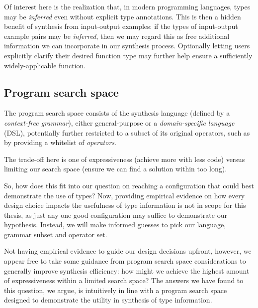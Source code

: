 \documentclass{article}
\begin{document}
Of interest here is the realization that, in modern programming languages, types may be \emph{inferred} even without explicit type annotations.
This is then a hidden benefit of synthesis from input-output examples:
if the types of input-output example pairs may be \emph{inferred},
then we may regard this as free additional information we can incorporate in our synthesis process.
    Optionally letting users explicitly clarify their desired function type
    may further help ensure a sufficiently widely-applicable function.

\subsection{Program search space}

The program search space consists of the synthesis language (defined by a \emph{context-free grammar}),
either general-purpose or a \emph{domain-specific language} (DSL),
potentially further restricted to a subset of its original operators,
such as by providing a whitelist of \emph{operators}.

The trade-off here is one of expressiveness (achieve more with less code) versus limiting our search space (ensure we can find a solution within too long).

So, how does this fit into our question on reaching a configuration that could best demonstrate the use of types?
Now, providing empirical evidence on how every design choice impacts the usefulness of type information is not in scope for this thesis,
as just any one good configuration may suffice to demonstrate our hypothesis.
Instead, we will make informed guesses
to pick our language, grammar subset and operator set.

Not having empirical evidence to guide our design decisions upfront, however,
we appear free to take some guidance from program search space considerations to generally improve synthesis efficiency:
how might we achieve the highest amount of expressiveness within a limited search space?
The answers we have found to this question, we argue,
is intuitively in line with a program search space designed to demonstrate the utility in synthesis of type information.
\end{document}
